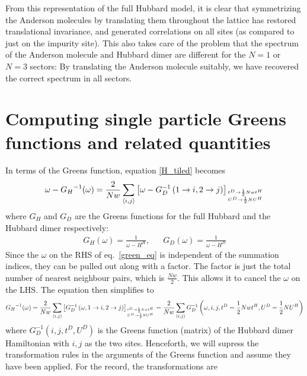 \documentclass[12pt]{article}
\numberwithin{equation}{section}
\begin{document}
From this representation of the full Hubbard model, it is clear that symmetrizing the Anderson molecules by translating them throughout the lattice has restored translational invariance, and generated correlations on all sites (as compared to just on the impurity site). This also takes care of the problem that the spectrum of the Anderson molecule and Hubbard dimer are different for the $N=1$ or $N=3$ sectors: By translating the Anderson molecule suitably, we have recovered the correct spectrum in all sectors.

\section{Computing single particle Greens functions and related quantities}
In terms of the Greens function, equation \ref{H_tiled} becomes
\begin{equation}\begin{aligned}
	\label{green_eq}
	\omega - {G_H}^{-1}(\omega) = \frac{2}{Nw}\sum_{\left<i,j\right>}\left[\omega - G_D^{-1}\left(1 \to i, 2 \to j\right)\right]_{t^D \to \frac{1}{2}Nwt^H \atop{U^D \to \frac{1}{2}N U^H}}
\end{aligned}\end{equation}
where $G_H$ and $G_D$ are the Greens functions for the full Hubbard and the Hubbard dimer respectively:
\begin{equation}\begin{aligned}
	G_H(\omega) = \frac{1}{\omega - H^H}, && G_D(\omega) = \frac{1}{\omega - H^D}
\end{aligned}\end{equation}
Since the $\omega$ on the RHS of eq.~\ref{green_eq} is independent of the summation indices, they can be pulled out along with a factor. The factor is just the total number of nearest neighbour pairs, which is $\frac{Nw}{2}$. This allows it to cancel the $\omega$ on the LHS. The equation then simplifies to
\begin{equation}\begin{aligned}
	\label{green_eq_final}
{G_H}^{-1}(\omega) = \frac{2}{Nw}\sum_{\left<i,j\right>}\left[G_D^{-1}\left(\omega, 1 \to i, 2 \to j\right)\right]_{t^D \to \frac{1}{2}Nwt^H \atop{U^D \to \frac{1}{2}N U^H}} = \frac{2}{Nw}\sum_{\left<i,j\right>}G_D^{-1}\left(\omega, i, j, t^D = \frac{1}{2}Nwt^H, U^D = \frac{1}{2}N U^H\right)
\end{aligned}\end{equation}
where $G_D^{-1}(i,j,t^D,U^D)$ is the Greens function (matrix) of the Hubbard dimer Hamiltonian with $i, j$ as the two sites. Henceforth, we will supress the transformation rules in the arguments of the Greens function and assume they have been applied. For the record, the transformations are
\end{document}
